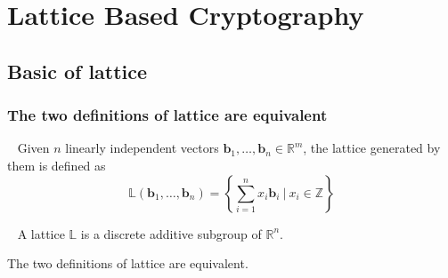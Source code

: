 
\chapter{Lattice Based Cryptography}
\section{Basic of lattice}
\subsection{The two definitions of lattice are equivalent}
\begin{definition}[Lattice]~\label{lattice1}
Given $n$ linearly independent vectors $\mathbf{b}_1, \ldots, \mathbf{b}_n \in \mathbb{R}^m$, the lattice generated by them is defined as
$$
\mathbb{L}(\mathbf{b}_1, \ldots, \mathbf{b}_n) = \left\{ \sum_{i=1}^{n} x_i \mathbf{b}_i \ \bigg| \ x_i \in \mathbb{Z} \right\}
$$
\end{definition}
\begin{definition}~\label{lattice2}
    A lattice $\mathbb{L}$ is a discrete additive subgroup of $\mathbb{R}^n$.
\end{definition}
\begin{theorem}
        The two definitions of lattice are equivalent.
\end{theorem}
